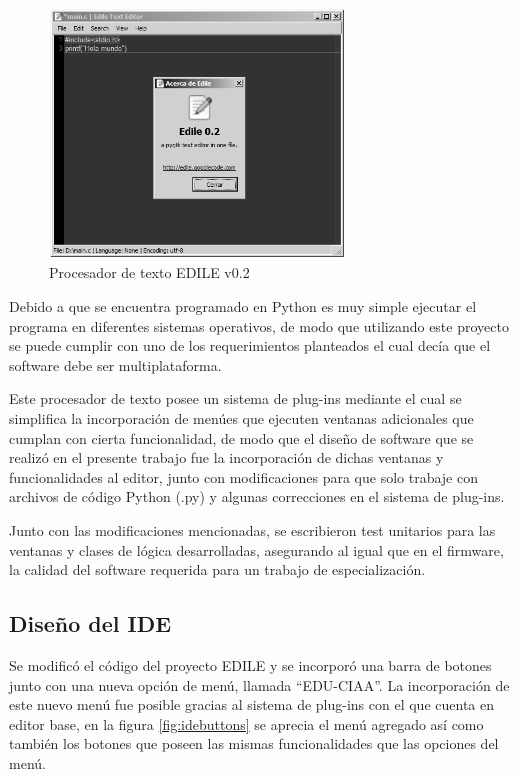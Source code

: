 \begin{figure}[ht]
  \centering
    \includegraphics[width=0.7\textwidth]{Figures/fig_edile}
  \caption{Procesador de texto EDILE v0.2}
  \label{fig:edile}
\end{figure}

Debido a que se encuentra programado en Python es muy simple ejecutar el programa en diferentes sistemas operativos, de modo que utilizando este proyecto se puede cumplir con uno de los requerimientos planteados el cual decía que el software debe ser multiplataforma.

Este procesador de texto posee un sistema de plug-ins mediante el cual se simplifica la incorporación de menúes que ejecuten ventanas adicionales que cumplan con cierta funcionalidad, de modo que el diseño de software que se realizó en el presente trabajo fue la incorporación de dichas ventanas y funcionalidades al editor, junto con modificaciones para que solo trabaje con archivos de código Python (.py) y algunas correcciones en el sistema de plug-ins.

Junto con las modificaciones mencionadas, se escribieron test unitarios para las ventanas y clases de lógica desarrolladas, asegurando al igual que en el firmware, la calidad del software requerida para un trabajo de especialización.

\subsection{Diseño del IDE} 

Se modificó el código del proyecto EDILE y se incorporó una barra de botones junto con una nueva opción de menú, llamada “EDU-CIAA”. La incorporación de este nuevo menú fue posible gracias al sistema de plug-ins con el que cuenta en editor base, en la figura \ref{fig:idebuttons} se aprecia el menú agregado así como también los botones que poseen las mismas funcionalidades que las opciones del menú.


